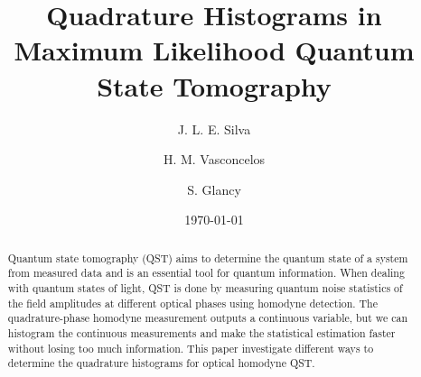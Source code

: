 \documentclass[
reprint,
superscriptaddress,
showpacs,
amsmath,
amssymb,
aps,
pra,
longbibliography
]{revtex4-1}
\begin{document}

\title{Quadrature Histograms in Maximum Likelihood Quantum State Tomography}%
\author{J. L. E. Silva}
\author{H. M. Vasconcelos}
\author{S. Glancy}


\date{\today}%

\begin{abstract}
Quantum state tomography (QST) aims to determine the quantum state of a system from measured data and is an essential tool for quantum information. When dealing with quantum states of light, QST is done by measuring  quantum  noise  statistics  of the  field  amplitudes  at different  optical  phases using homodyne detection. The quadrature-phase homodyne measurement outputs a continuous variable, but we can histogram the continuous measurements and make the statistical estimation faster without losing too much information. This paper investigate different ways to determine the quadrature 
histograms for optical homodyne QST.

\end{abstract}

\maketitle

\end{document}
